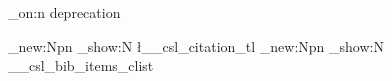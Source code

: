 \usepackage[enable-debug]{expl3}

\ExplSyntaxOn
\debug_on:n { deprecation }

\cs_new:Npn \showcitation
  { \tl_show:N \l__csl_citation_tl }
\cs_new:Npn \showbibliography
  { \clist_show:N \g__csl_bib_items_clist }

\ExplSyntaxOff
